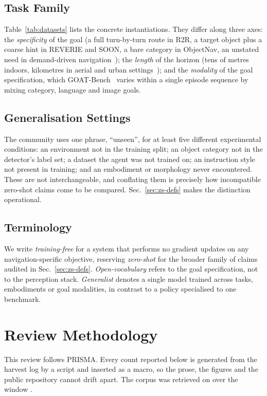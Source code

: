\documentclass[journal]{IEEEtran}
\begin{document}
\subsection{Task Family}
Table~\ref{tab:datasets} lists the concrete instantiations. They differ
along three axes: the \emph{specificity} of the goal (a full
turn-by-turn route in R2R, a target object plus a coarse hint in REVERIE
and SOON, a bare category in ObjectNav, an unstated need in demand-driven
navigation~\cite{huang2025cogddn}); the \emph{length} of the horizon
(tens of metres indoors, kilometres in aerial and urban
settings~\cite{lee2024citynav,li2025urbanvla}); and the \emph{modality} of
the goal specification, which GOAT-Bench~\cite{khanna2024goat} varies
within a single episode sequence by mixing category, language and image
goals.

\subsection{Generalisation Settings}
The community uses one phrase, ``unseen'', for at least five different
experimental conditions: an environment not in the training split; an
object category not in the detector's label set; a dataset the agent was
not trained on; an instruction style not present in training; and an
embodiment or morphology never encountered. These are not
interchangeable, and conflating them is precisely how incompatible
zero-shot claims come to be compared. Sec.~\ref{sec:zs-defs} makes the
distinction operational.

\subsection{Terminology}
We write \emph{training-free} for a system that performs no gradient
updates on any navigation-specific objective, reserving \emph{zero-shot}
for the broader family of claims audited in
Sec.~\ref{sec:zs-defs}. \emph{Open-vocabulary} refers to the goal
specification, not to the perception stack. \emph{Generalist} denotes a
single model trained across tasks, embodiments or goal modalities, in
contrast to a policy specialised to one benchmark.
\section{Review Methodology}\label{sec:method}
This review follows PRISMA. Every count reported below is generated from
the harvest log by a script and inserted as a macro, so the prose, the
figures and the public repository cannot drift apart. The corpus was
retrieved on \HarvestDate{} over the window \HarvestWindow{}.
\end{document}

